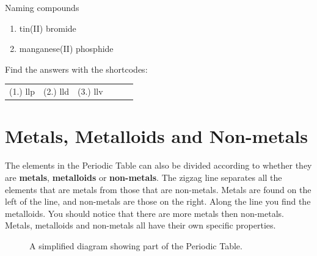 \begin{exercises}{Naming compounds}
{\begin{enumerate}[noitemsep, label=\textbf{\arabic*}. ]
\begin{enumerate}[noitemsep, label=\textbf{\alph*}. ]
\item tin(II) bromide
\item manganese(II) phosphide
\end{enumerate}
\end{enumerate}
    \label{m38708*cid5}
\par {} Find the answers with the shortcodes:
 \par \begin{tabular}[h]{cccccc}
 (1.) llp  &  (2.) lld  &  (3.) llv   & & \end{tabular}}
\end{exercises}
            \section{Metals, Metalloids and Non-metals}
            \nopagebreak
      \label{m38708*id65693}The elements in the Periodic Table can also be divided according to whether they are \textbf{metals}, \textbf{metalloids} or \textbf{non-metals}. The zigzag line separates all the elements that are metals from those that are non-metals. Metals are found on the left of the line, and non-metals are those on the right. Along the line you find the metalloids. You should notice that there are more metals then non-metals. Metals, metalloids and non-metals all have their own specific properties.\par 
\begin{figure}[h]

\begin{center}
\end{center}
\caption{A simplified diagram showing part of the Periodic Table.}
\label{fig:periodic}
\end{figure}
      \label{m38708*uid76}
